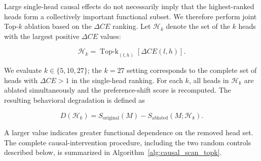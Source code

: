 Large single-head causal effects do not necessarily imply that the highest-ranked heads form a collectively important functional subset. We therefore perform joint Top-$k$ ablation based on the $\Delta CE$ ranking. Let $\mathcal{H}_{k}$ denote the set of the $k$ heads with the largest positive $\Delta CE$ values:

\begin{equation}
\mathcal{H}_{k}
=
\operatorname{Top\text{-}k}_{(l,h)}
\left[
\Delta CE(l,h)
\right].
\label{eq:topk_set}
\end{equation}

We evaluate $k\in\{5,10,27\}$; the $k=27$ setting corresponds to the complete set of heads with $\Delta CE>1$ in the single-head ranking. For each $k$, all heads in $\mathcal{H}_{k}$ are ablated simultaneously and the preference-shift score is recomputed. The resulting behavioral degradation is defined as

\begin{equation}
D(\mathcal{H}_{k})
=
S_{\mathrm{original}}(M)
-
S_{\mathrm{ablated}}(M;\mathcal{H}_{k}).
\label{eq:topk_degradation}
\end{equation}

A larger value indicates greater functional dependence on the removed head set. The complete causal-intervention procedure, including the two random controls described below, is summarized in Algorithm~\ref{alg:causal_scan_topk}.

\makeatletter
\setlength{\@fptop}{0pt}
\makeatother

